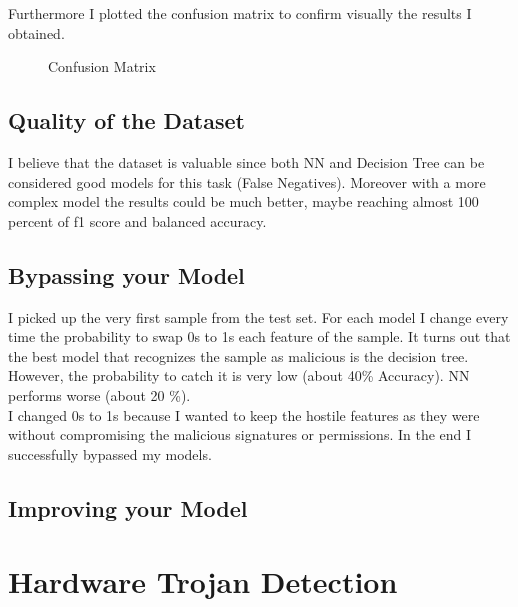 \documentclass[unicode,11pt,a4paper,oneside,numbers=endperiod,openany]{scrartcl}
\begin{document}
Furthermore I plotted the confusion matrix to confirm visually the results I obtained. 
\begin{figure}
  \centering
  \hfill
  \hfill
  \caption{Confusion Matrix}
\end{figure}
\subsection{Quality of the Dataset}
I believe that the dataset is valuable since both NN and Decision Tree can be considered good models for this task (False Negatives). 
Moreover with a more complex model the results could be much better, maybe reaching almost 100 percent of f1 score and balanced accuracy. 



\subsection{Bypassing your Model}
I picked up the very first sample from the test set. For each model I change every time the probability to swap 0s to 1s each feature of the sample. 
It turns out that the best model that recognizes the sample as malicious is the decision tree. However, the probability to catch it is very low (about 40\% Accuracy). NN performs worse (about 20 \%).\\
I changed 0s to 1s because I wanted to keep the hostile features as they were without compromising the malicious signatures or permissions.  
In the end I successfully bypassed my models. 
\subsection{Improving your Model}

\section{Hardware Trojan Detection}
\end{document}
